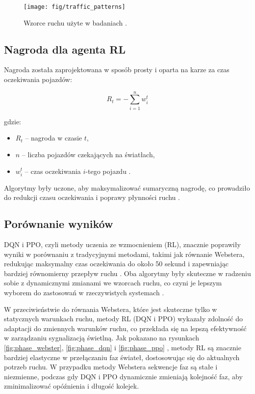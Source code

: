 \documentclass[12pt, a4paper]{article} %
\begin{document}
    \begin{figure}[h]
        \centering
        \texttt{[image: fig/traffic\_patterns]}
        \caption{Wzorce ruchu użyte w badaniach \cite{Louw2022}.}
        \label{fig:traffic_patterns}
    \end{figure}

    \subsection{Nagroda dla agenta RL}
    Nagroda została zaprojektowana w sposób prosty i oparta na karze za czas oczekiwania pojazdów:

    \[
        R_t = -\sum_{i=1}^{n} w_i^t
    \]

    gdzie:
    \begin{itemize}
        \item \( R_t \) – nagroda w czasie \( t \),
        \item \( n \) – liczba pojazdów czekających na światłach,
        \item \( w_i^t \) – czas oczekiwania \( i \)-tego pojazdu \cite{Louw2022}.
    \end{itemize}

    Algorytmy były uczone, aby maksymalizować sumaryczną nagrodę, co prowadziło do redukcji czasu oczekiwania i poprawy
    płynności ruchu \cite{Mnih2015}.

    \subsection{Porównanie wyników}
    DQN i PPO, czyli metody uczenia ze wzmocnieniem (RL), znacznie poprawiły wyniki w porównaniu z tradycyjnymi
    metodami, takimi jak równanie Webstera, redukując maksymalny czas oczekiwania do około 50 sekund i zapewniając
    bardziej równomierny przepływ ruchu \cite{Louw2022}
    . Oba algorytmy były skuteczne w radzeniu sobie z dynamicznymi zmianami we wzorcach ruchu, co czyni je lepszym
    wyborem do zastosowań w rzeczywistych systemach \cite{Louw2022}.

    W przeciwieństwie do równania Webstera, które jest skuteczne tylko w statycznych warunkach ruchu, metody RL (DQN i
    PPO) wykazały zdolność do adaptacji do zmiennych warunków ruchu, co przekłada się na lepszą efektywność w
    zarządzaniu sygnalizacją świetlną. Jak pokazano na rysunkach \ref{fig:phase_webster}, \ref{fig:phase_dqn} i
    \ref{fig:phase_ppo}
    , metody RL są znacznie bardziej elastyczne w przełączaniu faz świateł, dostosowując się do aktualnych potrzeb
    ruchu. W przypadku metody Webstera sekwencje faz są stałe i niezmienne, podczas gdy DQN i PPO dynamicznie zmieniają
    kolejność faz, aby zminimalizować opóźnienia i długość kolejek.
\end{document}
